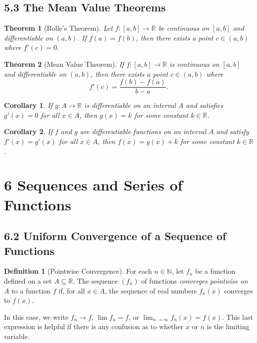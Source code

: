 \documentclass{amsart}
\newtheorem*{theorem}{Theorem}
\newtheorem*{corollary}{Corollary}
\theoremstyle{definition}
\newtheorem*{definition}{Definition}
\newcommand{\N}{\mathbb{N}}
\newcommand{\R}{\mathbb{R}}
\begin{document}
\subsection*{5.3 The Mean Value Theorems}

\begin{theorem}[Rolle's Theorem]
  Let $f : [a, b] \to \R$ be continuous on $[a, b]$ and differentiable on $(a,
  b)$. If $f(a) = f(b)$, then there exists a point $c \in (a, b)$ where $f'(c) =
  0$.
\end{theorem}

\begin{theorem}[Mean Value Theorem]
  If $f : [a, b] \to \R$ is continuous on $[a, b]$ and differentiable on $(a,
  b)$, then there exists a point $c \in (a, b)$ where
  \[
    f'(c) = \frac{f(b) - f(a)}{b - a}.
  \]
\end{theorem}

\begin{corollary}
  If $g : A \to \R$ is differentiable on an interval $A$ and satisfies $g'(x) =
  0$ for all $x \in A$, then $g(x) = k$ for some constant $k \in \R$.
\end{corollary}

\begin{corollary}
  If $f$ and $g$ are differentiable functions on an interval $A$ and satisfy
  $f'(x) = g'(x)$ for all $x \in A$, then $f(x) = g(x) + k$ for some constant $k
  \in \R$.
\end{corollary}

\section*{6 Sequences and Series of Functions}

\subsection*{6.2 Uniform Convergence of a Sequence of Functions}

\begin{definition}[Pointwise Convergence]
  For each $n \in \N$, let $f_n$ be a function defined on a set $A \subseteq
  \R$. The sequence $(f_n)$ of functions \emph{converges pointwise on $A$} to a
  function $f$ if, for all $x \in A$, the sequence of real numbers $f_n(x)$
  converges to $f(x)$.

  In this case, we write $f_n \to f$, $\lim f_n = f$, or $\lim_{n \to \infty}
  f_n(x) = f(x)$. This last expression is helpful if there is any confusion as
  to whether $x$ or $n$ is the limiting variable.
\end{definition}
\end{document}
